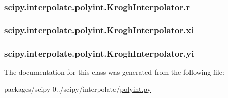 \subsubsection[{r}]{\setlength{\rightskip}{0pt plus 5cm}scipy.\+interpolate.\+polyint.\+Krogh\+Interpolator.\+r}\label{classscipy_1_1interpolate_1_1polyint_1_1KroghInterpolator_a1f30434de264f2c14bb054764e6efa35}
\hypertarget{classscipy_1_1interpolate_1_1polyint_1_1KroghInterpolator_acc8643d0c76444c98db806722db1d144}{}
\subsubsection[{xi}]{\setlength{\rightskip}{0pt plus 5cm}scipy.\+interpolate.\+polyint.\+Krogh\+Interpolator.\+xi}\label{classscipy_1_1interpolate_1_1polyint_1_1KroghInterpolator_acc8643d0c76444c98db806722db1d144}
\hypertarget{classscipy_1_1interpolate_1_1polyint_1_1KroghInterpolator_a3666892eff7b45b8bbd623bc7760457f}{}
\subsubsection[{yi}]{\setlength{\rightskip}{0pt plus 5cm}scipy.\+interpolate.\+polyint.\+Krogh\+Interpolator.\+yi}\label{classscipy_1_1interpolate_1_1polyint_1_1KroghInterpolator_a3666892eff7b45b8bbd623bc7760457f}


The documentation for this class was generated from the following file\+:\begin{DoxyCompactItemize}
\item 
packages/scipy-\/0../scipy/interpolate/\hyperlink{polyint_8py}{polyint.\+py}\end{DoxyCompactItemize}
